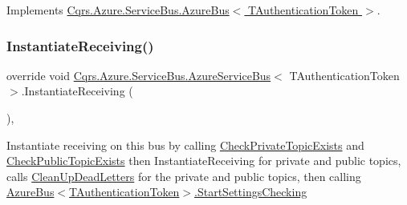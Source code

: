 Implements \hyperlink{classCqrs_1_1Azure_1_1ServiceBus_1_1AzureBus_a0bacaa4619921333da4a27371c1d6d0a_a0bacaa4619921333da4a27371c1d6d0a}{Cqrs.\+Azure.\+Service\+Bus.\+Azure\+Bus$<$ T\+Authentication\+Token $>$}.

\mbox{\label{classCqrs_1_1Azure_1_1ServiceBus_1_1AzureServiceBus_ad49a2d063279ec98443e7f1d69178cfa_ad49a2d063279ec98443e7f1d69178cfa}} 
\subsubsection{\texorpdfstring{Instantiate\+Receiving()}{InstantiateReceiving()}\hspace{0.1cm}{\footnotesize\ttfamily [1/2]}}
{\footnotesize\ttfamily override void \hyperlink{classCqrs_1_1Azure_1_1ServiceBus_1_1AzureServiceBus}{Cqrs.\+Azure.\+Service\+Bus.\+Azure\+Service\+Bus}$<$ T\+Authentication\+Token $>$.Instantiate\+Receiving (\begin{DoxyParamCaption}{ }\end{DoxyParamCaption})\hspace{0.3cm}{\ttfamily [protected]}, {\ttfamily [virtual]}}



Instantiate receiving on this bus by calling \hyperlink{classCqrs_1_1Azure_1_1ServiceBus_1_1AzureServiceBus_add2d99ff99f1af5470082b1de340c04a_add2d99ff99f1af5470082b1de340c04a}{Check\+Private\+Topic\+Exists} and \hyperlink{classCqrs_1_1Azure_1_1ServiceBus_1_1AzureServiceBus_aae464d1d93ae6600ff5ace028160dd3c_aae464d1d93ae6600ff5ace028160dd3c}{Check\+Public\+Topic\+Exists} then Instantiate\+Receiving for private and public topics, calls \hyperlink{classCqrs_1_1Azure_1_1ServiceBus_1_1AzureServiceBus_a8d1d5833d49b7793933825f2a13fb8b7_a8d1d5833d49b7793933825f2a13fb8b7}{Clean\+Up\+Dead\+Letters} for the private and public topics, then calling \hyperlink{classCqrs_1_1Azure_1_1ServiceBus_1_1AzureBus_acb7f47329c17646805545e78d0776efe_acb7f47329c17646805545e78d0776efe}{Azure\+Bus$<$\+T\+Authentication\+Token$>$.\+Start\+Settings\+Checking} 



